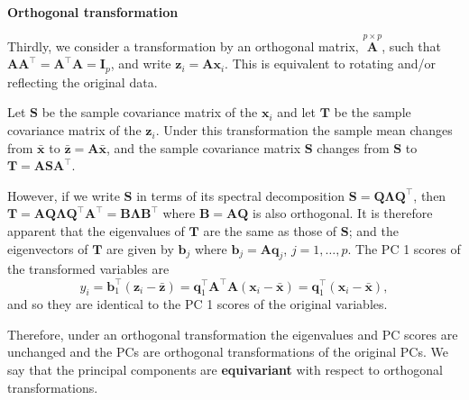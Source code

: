 \documentclass[]{book}
\theoremstyle{definition}
\theoremstyle{definition}
\theoremstyle{definition}
\theoremstyle{remark}
\begin{document}
\textbf{Orthogonal transformation}

Thirdly, we consider a transformation by an orthogonal matrix, \(\stackrel{p \times p}{\boldsymbol A}\), such that \(\boldsymbol A\boldsymbol A^\top = \boldsymbol A^\top \boldsymbol A= \boldsymbol I_p\), and write \(\boldsymbol z_i = \boldsymbol A\boldsymbol x_i\). This is equivalent to rotating and/or reflecting the original data.

Let \(\boldsymbol S\) be the sample covariance matrix of the \(\boldsymbol x_i\) and let \(\boldsymbol T\) be the sample covariance matrix of the \(\boldsymbol z_i\). Under this transformation the sample mean changes from \(\bar{\boldsymbol x}\) to \(\bar{\boldsymbol z} = \boldsymbol A\bar{\boldsymbol x}\), and the sample covariance matrix \(\boldsymbol S\) changes from \(\boldsymbol S\) to \(\boldsymbol T= \boldsymbol A\boldsymbol S\boldsymbol A^\top\).

However, if we write \(\boldsymbol S\) in terms of its spectral decomposition \(\boldsymbol S= \boldsymbol Q\boldsymbol \Lambda\boldsymbol Q^\top\), then \(\boldsymbol T= \boldsymbol A\boldsymbol Q\boldsymbol \Lambda\boldsymbol Q^\top \boldsymbol A^\top = \boldsymbol B\boldsymbol \Lambda\boldsymbol B^\top\) where \(\boldsymbol B= \boldsymbol A\boldsymbol Q\) is also orthogonal. It is therefore apparent that the eigenvalues of \(\boldsymbol T\) are the same as those of \(\boldsymbol S\); and the eigenvectors of \(\boldsymbol T\) are given by \(\boldsymbol b_j\) where \(\boldsymbol b_j = \boldsymbol A\boldsymbol q_j\), \(j=1,\ldots,p\). The PC 1 scores of the transformed variables are
\[ y_i = \boldsymbol b_1^\top (\boldsymbol z_i - \bar{\boldsymbol z}) = \boldsymbol q_1^\top \boldsymbol A^\top \boldsymbol A(\boldsymbol x_i - \bar{\boldsymbol x}) = \boldsymbol q_1^\top (\boldsymbol x_i - \bar{\boldsymbol x}),\]
and so they are identical to the PC 1 scores of the original variables.

Therefore, under an orthogonal transformation the eigenvalues and PC scores are unchanged and the PCs are orthogonal transformations of the original PCs. We say that the principal components are \textbf{equivariant} with respect to orthogonal transformations.
\end{document}
